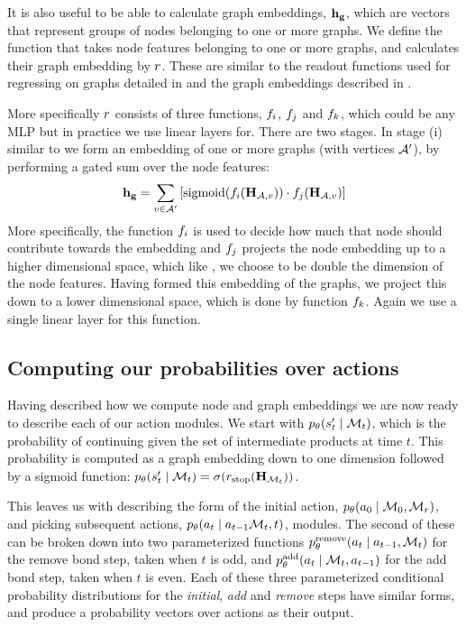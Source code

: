 It is also useful to be able to calculate graph embeddings, $\mathbf{h_g}$, which are vectors that represent groups of nodes belonging to one or more graphs.
 We define the function that takes node features belonging to one or more graphs, and calculates their graph embedding by $r$.
These are similar to the readout functions used for regressing on graphs detailed in \citep[Eq. 3]{gilmer2017neural} and the graph embeddings described in \citet[\S B.1]{li2018learning}. 


More specifically $r$ consists of three functions, $f_i$, $f_j$ and $f_k$, which could be any MLP but in practice we use linear layers for.
 There are two stages. 
In stage (i) similar to \citet[\S B.1]{li2018learning} we form an embedding of one or more graphs (with vertices ${\mathcal{A}}'$), by performing a gated sum over the node features:
\begin{align*}
	\mathbf{h_g} = \sum_{v \in {\mathcal{A}}'} \left[ \mbox{sigmoid}(f_i({\mathbf{H}}_{{\mathcal{A}},v})) \cdot f_j({\mathbf{H}}_{{\mathcal{A}},v}) \right]
\end{align*}
More specifically, the function $f_i$ is used to decide how much that node should contribute towards the embedding and $f_j$ projects the node embedding up to a higher dimensional space, which like \citet[\S B.1]{li2018learning}, we choose to be double the dimension of the node features.
Having formed this embedding of the graphs, we project this down to a lower dimensional space, which is done by function $f_k$. 
Again we use a single linear layer for this function.


\subsection{Computing our probabilities over actions}

Having described how we compute node and graph embeddings we are now ready to describe each of our action modules. We start with $p_\theta(s'_t \mid {\mathcal{M}}_t)$, which is the probability of continuing given the set of intermediate products at time $t$. This probability is computed as a graph embedding down to one dimension followed by a sigmoid function: $p_\theta(s'_t \mid {\mathcal{M}}_t) = \sigma(r_{\textrm{stop}}({\mathbf{H}}_{{\mathcal{M}}_t}))$.


This leaves us with describing the form of the initial action, $p_\theta(a_0 \mid {\mathcal{M}}_0, {\mathcal{M}}_r)$, and picking subsequent actions, $p_\theta(a_t \mid a_{t-1} {\mathcal{M}}_t, t)$, modules.
 The second of these can be broken down into two parameterized functions
$p_\theta^\textrm{remove}(a_t \mid a_{t-1}, {\mathcal{M}}_t)$ for the remove bond step, taken when $t$ is odd, and $p_\theta^\textrm{add}(a_t \mid {\mathcal{M}}_t, a_{t-1})$ for the add bond step, taken when $t$ is even. 
 Each of these three parameterized conditional probability distributions for the {\em initial}, {\em add} and {\em remove} steps have similar forms, and produce a probability vectors over actions as their output. 
 

